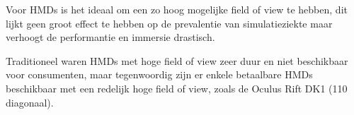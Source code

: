 Voor HMDs is het ideaal om een zo hoog mogelijke field of view te hebben, dit
lijkt geen groot effect te hebben op de prevalentie van 
simulatieziekte\cite{arthur00} maar verhoogt de performantie en immersie
drastisch\cite{arthur00}.

Traditioneel waren HMDs met hoge field of view zeer duur en niet beschikbaar voor
consumenten, maar tegenwoordig zijn er enkele betaalbare HMDs beschikbaar met een
redelijk hoge field of view, zoals de Oculus Rift DK1 (110\textdegree{} 
diagonaal).
